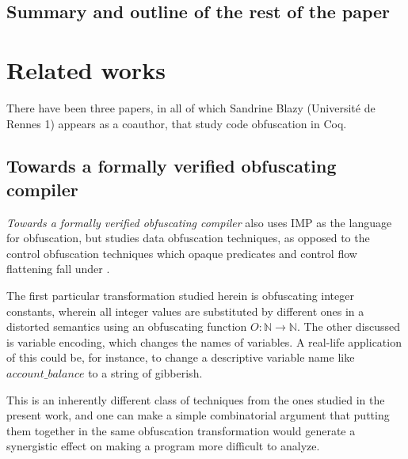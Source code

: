 \documentclass[compsoc,conference,a4paper,10pt,times]{IEEEtran}
\begin{document}
\subsection{Summary and outline of the rest of the paper}

\section{Related works}
There have been three papers, in all of which Sandrine Blazy (Universit\'{e} de Rennes 1) appears as a coauthor, that study code obfuscation in Coq.

\subsection*{Towards a formally verified obfuscating compiler}
\par \emph{Towards a formally verified obfuscating compiler} \cite{Blazy1} also uses IMP as the language for obfuscation, but studies data obfuscation techniques, as opposed to the control obfuscation techniques which opaque predicates and control flow flattening fall under \cite{CollbergTax}.
\par The first particular transformation studied herein is obfuscating integer constants, wherein all integer values are substituted by different ones in a distorted semantics using an obfuscating function $O: \mathbb{N} \to \mathbb{N}$.  The other discussed is variable encoding, which changes the names of variables.  A real-life application of this could be, for instance, to change a descriptive variable name like $account\_balance$ to a string of gibberish.
\par This is an inherently different class of techniques from the ones studied in the present work, and one can make a simple combinatorial argument that putting them together in the same obfuscation transformation would generate a synergistic effect on making a program more difficult to analyze.
\end{document}
